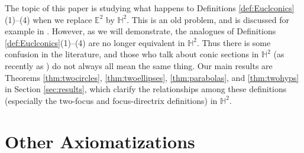 \documentclass[12pt]{amsart}
\theoremstyle{definition}
\begin{document}
The topic of this paper is studying what happens to Definitions
\ref{def:Euclconics}(1)--(4) when we replace ${\mathbb E}^2$ by ${\mathbb H}^2$.
This is an old problem, and is discussed for example in
\cite{MR1505334,MR1628013,MR0095442,MR0171205,MR487028}.  However, as
we will demonstrate, the analogues of Definitions
\ref{def:Euclconics}(1)--(4) are 
no longer equivalent in ${\mathbb H}^2$.  Thus there is some confusion in the
literature, and those who talk about conic sections in ${\mathbb H}^2$ (as
recently as \cite{MR3274526,2015arXiv150406450}) do not
always all mean the same thing.  Our main results are
Theorems \ref{thm:twocircles}, \ref{thm:twoellipses},
\ref{thm:parabolas}, and \ref{thm:twohyps} in Section
\ref{sec:results}, which clarify the relationships among these
definitions (especially the two-focus and focus-directrix definitions)
in ${\mathbb H}^2$.

\section{Other Axiomatizations}
\label{sec:axioms}
\end{document}
